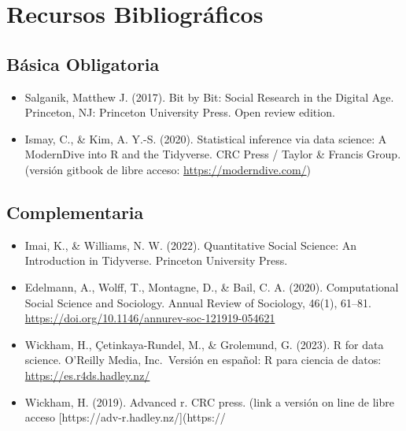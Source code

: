 \documentclass[11pt,letter,]{article}
\providecommand{\tightlist}{%
  \setlength{\itemsep}{0pt}\setlength{\parskip}{0pt}}
\begin{document}
\hypertarget{recursos-bibliogruxe1ficos}{%
\section{Recursos Bibliográficos}\label{recursos-bibliogruxe1ficos}}

\hypertarget{buxe1sica-obligatoria}{%
\subsection{Básica Obligatoria}\label{buxe1sica-obligatoria}}

\begin{itemize}
\tightlist
\item
  Salganik, Matthew J. (2017). Bit by Bit: Social Research in the
  Digital Age. Princeton, NJ: Princeton University Press. Open review
  edition.
\item
  Ismay, C., \& Kim, A. Y.-S. (2020). Statistical inference via data
  science: A ModernDive into R and the Tidyverse. CRC Press / Taylor \&
  Francis Group. (versión gitbook de libre acceso:
  \url{https://moderndive.com/})
\end{itemize}

\hypertarget{complementaria}{%
\subsection{Complementaria}\label{complementaria}}

\begin{itemize}
\tightlist
\item
  Imai, K., \& Williams, N. W. (2022). Quantitative Social Science: An
  Introduction in Tidyverse. Princeton University Press.
\item
  Edelmann, A., Wolff, T., Montagne, D., \& Bail, C. A. (2020).
  Computational Social Science and Sociology. Annual Review of
  Sociology, 46(1), 61--81.
  \url{https://doi.org/10.1146/annurev-soc-121919-054621}
\item
  Wickham, H., Çetinkaya-Rundel, M., \& Grolemund, G. (2023). R for data
  science. O'Reilly Media, Inc.~Versión en español: R para ciencia de
  datos: \url{https://es.r4ds.hadley.nz/}
\item
  Wickham, H. (2019). Advanced r. CRC press. (link a versión on line de
  libre acceso {[}https://adv-r.hadley.nz/{]}(https://
\end{itemize}
\end{document}
